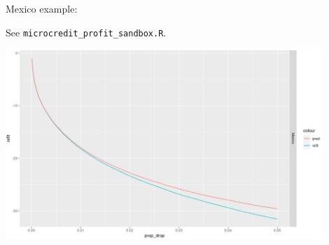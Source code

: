 

%
%
%
%




\begin{frame}


Mexico example:

See \texttt{microcredit\_profit\_sandbox.R}.

\includegraphics[width=0.9\textwidth]{static_figures/mx_refit_example}

\end{frame}






